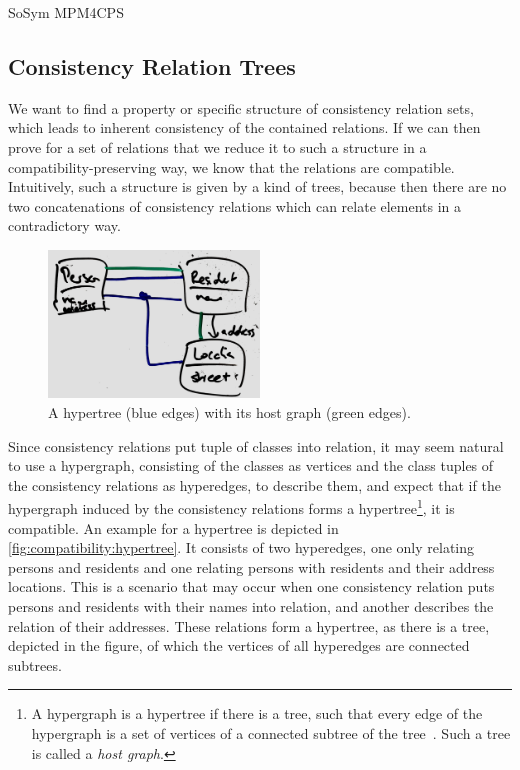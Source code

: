 \begin{copiedFrom}{SoSym MPM4CPS}


\subsection{Consistency Relation Trees}

We want to find a property or specific structure of consistency relation sets, which leads to inherent consistency of the contained relations.
If we can then prove for a set of relations that we reduce it to such a structure in a compatibility-preserving way, we know that the relations are compatible.
Intuitively, such a structure is given by a kind of trees, because then there are no two concatenations of consistency relations which can relate elements in a contradictory way.

\begin{figure}
    \centering
    \includegraphics[width=0.5\textwidth]{figures/correctness/compatibility/hypertree.jpg}
    \caption{A hypertree (blue edges) with its host graph (green edges).}
    \label{fig:compatibility:hypertree}
\end{figure}

Since consistency relations put tuple of classes into relation, it may seem natural to use a hypergraph, consisting of the classes as vertices and the class tuples of the consistency relations as hyperedges, to describe them, and expect that if the hypergraph induced by the consistency relations forms a hypertree\footnote{A hypergraph is a hypertree if there is a tree, such that every edge of the hypergraph is a set of vertices of a connected subtree of the tree~\cite{brandstaedt1998hypertrees}. Such a tree is called a \emph{host graph}.}, it is compatible.
An example for a hypertree is depicted in \autoref{fig:compatibility:hypertree}.
It consists of two hyperedges, one only relating persons and residents and one relating persons with residents and their address locations.
This is a scenario that may occur when one consistency relation puts persons and residents with their names into relation, and another describes the relation of their addresses.
These relations form a hypertree, as there is a tree, depicted in the figure, of which the vertices of all hyperedges are connected subtrees.


\end{copiedFrom}
